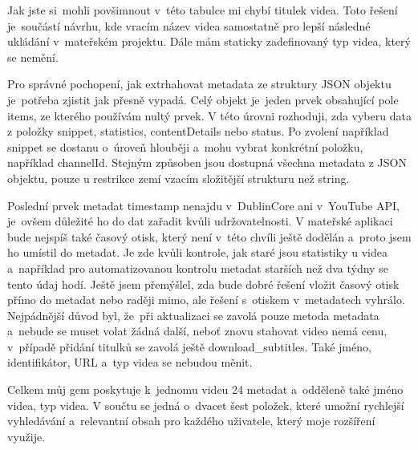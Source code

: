 \par Jak jste si~mohli povšimnout v~této tabulce mi chybí titulek videa. Toto řešení je~součástí návrhu, kde vracím název videa samostatně pro lepší následné ukládání v~mateřském projektu. Dále mám staticky zadefinovaný typ videa, který se nemění. 
\par Pro správné pochopení, jak extrhahovat metadata ze struktury JSON objektu je~potřeba zjistit jak přesně vypadá. Celý objekt je~jeden prvek obsahující pole items, ze kterého používám nultý prvek. V této úrovni rozhoduji, zda vyberu data z položky snippet, statistics, contentDetails nebo status. Po zvolení například snippet se dostanu o~úroveň hlouběji a~mohu vybrat konkrétní položku, například channelId. Stejným způsoben jsou dostupná všechna metadata z JSON objektu, pouze u restrikce zemí vzacím složitější strukturu než string.
\par Poslední prvek metadat timestamp nenajdu v~DublinCore ani v~YouTube API, je~ovšem důležité ho do dat zařadit kvůli udržovatelnosti. V mateřské aplikaci bude nejspíš také časový otisk, který není v~této chvíli ještě dodělán a~proto jsem ho umístil do metadat. Je zde kvůli kontrole, jak staré jsou statistiky u videa a~například pro automatizovanou kontrolu metadat starších než dva týdny se tento údaj hodí. Ještě jsem přemýšlel, zda bude dobré řešení vložit časový otisk přímo do metadat nebo raději mimo, ale řešení s~otiskem v~metadatech vyhrálo. Nejpádnější důvod byl, že~při aktualizaci se zavolá pouze metoda metadata a~nebude se muset volat žádná další, neboť znovu stahovat video nemá cenu, v~případě přidání titulků se zavolá ještě download\_subtitles. Také jméno, identifikátor, URL a~typ videa se nebudou měnit.
\par Celkem můj gem poskytuje k~jednomu videu 24 metadat a~odděleně také jméno videa, typ videa. V součtu se jedná o~dvacet šest položek, které umožní rychlejší vyhledávání a~relevantní obsah pro každého uživatele, který moje rozšíření využije.

